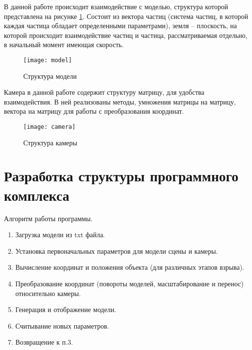 В данной работе происходит взаимодействие с моделью, структура которой представлена на рисунке \ref{img:model}. Состоит из вектора частиц (система частиц, в которой каждая частица обладает определенными параметрами), земля -- плоскость, на которой происходит взаимодействие частиц и частица, рассматриваемая отдельно, в начальный момент имеющая скорость. 

\begin{figure}[H]
	\centering
	\texttt{[image: model]}
	\caption{Структура модели}
	\label{img:model}
\end{figure}

Камера в данной работе содержит структуру матрицу, для удобства взаимодействия. В ней реализованы методы, умножения матрицы на матрицу, вектора на матрицу для работы с преобразования координат. 

\begin{figure}[H]
	\centering
	\texttt{[image: camera]}
	\caption{Структура камеры}
	\label{img:camera}
\end{figure}

\section{\textbf{Разработка структуры программного комплекса}}
\hfill

Алгоритм работы программы. 
\begin{enumerate}
	\item[1. ] Загрузка модели из txt файла.
	\item[2. ] Установка первоначальных параметров для модели сцены и камеры. 
	\item[3. ] Вычисление координат и положения объекта (для различных этапов взрыва). 
	\item[4. ] Преобразование координат (повороты моделей, масштабирование и перенос) относительно камеры.
	\item[5. ] Генерация и отображение модели. 
	\item[6. ] Считывание новых параметров. 
	\item[7. ] Возвращение к п.3. 
\end{enumerate}



